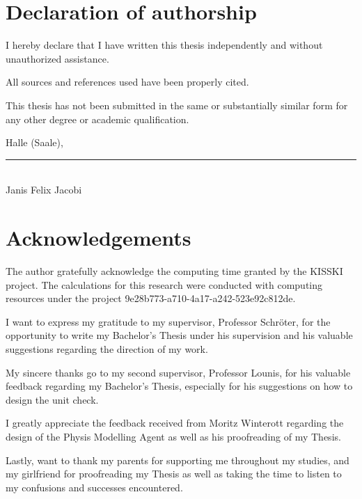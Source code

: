 \documentclass[
	fontsize = 11pt,
	paper = a4,
	draft = false,
	twoside = true,
	titlepage = false
]{scrartcl}
\newcommand{\aauthor}{Janis Felix Jacobi}
\numberwithin{equation}{subsection}
\begin{document}
	\pagebreak
	\raggedbottom
	\section*{Declaration of authorship}
	
	I hereby declare that I have written this thesis independently and without unauthorized assistance.
	
	All sources and references used have been properly cited.
	
	This thesis has not been submitted in the same or substantially similar form for any other degree or academic qualification.
	
	Halle (Saale), 
	
	\rule{7cm}{0.4pt} \\
	\aauthor
	\pagebreak
	\section*{Acknowledgements}
	The author gratefully acknowledge the computing time granted by the KISSKI project. The calculations for this research were conducted with computing resources under the project 9e28b773-a710-4a17-a242-523e92c812de.
	
	I want to express my gratitude to my supervisor, Professor Schröter, for the opportunity to write my Bachelor's Thesis under his supervision and his valuable suggestions regarding the direction of my work.
	
	My sincere thanks go to my second supervisor, Professor Lounis, for his valuable feedback regarding my Bachelor's Thesis, especially for his suggestions on how to design the unit check.
	
	I greatly appreciate the feedback received from Moritz Winterott regarding the design of the Physis Modelling Agent as well as his proofreading of my Thesis.
	
	Lastly, want to thank my parents for supporting me throughout my studies, and my girlfriend for proofreading my Thesis as well as taking the time to listen to my confusions and successes encountered.
		
		
\end{document}

